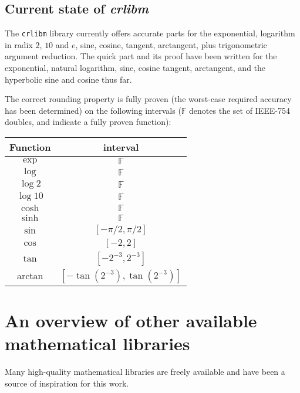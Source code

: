 \subsection{Current state of \emph{crlibm} 
\label{sec:current-state} }

The \texttt{crlibm} library currently offers accurate parts for the exponential,
logarithm in radix $2$, $10$ and $e$, sine, cosine, tangent,
arctangent, plus trigonometric argument reduction. The quick part and
its proof have been written for the exponential, natural logarithm,
sine, cosine tangent, arctangent, and the hyperbolic sine and cosine
thus far.

The correct rounding property is fully proven (the worst-case required
accuracy has been determined) on the following intervals ($\mathbb{F}$
denotes the set of IEEE-754 doubles, and indicate a fully proven
function):

\begin{center}
  \begin{tabular}{|c|c|}
    \hline
    Function & interval\\
    \hline
    \hline
    $\exp$ & $\mathbb{F}$  \\
    \hline
    $\log$ & $\mathbb{F}$  \\
    \hline
    $\log2$ & $\mathbb{F}$  \\
    \hline
    $\log10$ & $\mathbb{F}$  \\
    \hline
    $\cosh$ & $\mathbb{F}$  \\
    \hline
    $\sinh$ & $\mathbb{F}$  \\
    \hline
    $\sin$  & $[-\pi/2, \pi/2]$  \\
    \hline
    $\cos$  & $[-2, 2]$  \\
    \hline
    $\tan$  & $[-2^{-3}, 2^{-3}]$  \\
    \hline
    $\arctan$  & $[-\tan(2^{-3}), \tan(2^{-3})]$ \\
    \hline
  \end{tabular}

\end{center}

\section{An overview of other  available mathematical libraries\label{section:lib-overview}}

Many high-quality mathematical libraries are freely available and have
been a source of inspiration for this work.

